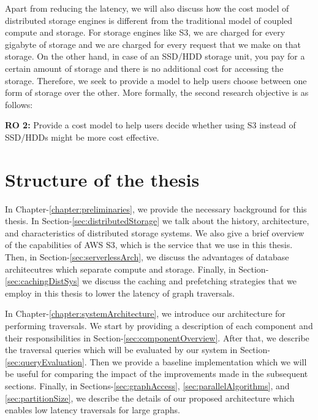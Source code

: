 \medskip
Apart from reducing the latency, we will also discuss how the cost model of
distributed storage engines is different from the traditional model of coupled
compute and storage. For storage engines like S3, we are charged for every
gigabyte of storage and we are charged for every request that we make on that
storage. On the other hand, in case of an SSD/HDD storage unit, you pay for a
certain amount of storage and there is no additional cost for accessing the
storage. Therefore, we seek to provide a model to help users choose between one
form of storage over the other. More formally, the second research objective is
as follows:
\begin{displayquote}
    \textbf{RO 2:} Provide a cost model to help users decide whether using S3
    instead of SSD/HDDs might be more cost effective.
\end{displayquote}


\section{Structure of the thesis}

\medskip
In Chapter-\ref{chapter:preliminaries}, we provide the necessary background for
this thesis. In Section-\ref{sec:distributedStorage} we talk about the
history, architecture, and characteristics of distributed storage systems. We
also give a brief overview of the capabilities of AWS S3, which is the service
that we use in this thesis. Then,
in Section-\ref{sec:serverlessArch}, we discuss the advantages of database
architecutres which separate compute and storage. Finally, in
Section-\ref{sec:cachingDistSys} we discuss the caching and prefetching
strategies that we employ in this thesis to lower the latency of graph
traversals.

\medskip
In Chapter-\ref{chapter:systemArchitecture}, we introduce our architecture for
performing traversals. We start by providing a description of each component and their
responsibilities in Section-\ref{sec:componentOverview}. After that, we describe
the traversal queries which will be evaluated by our system in Section-\ref{sec:queryEvaluation}.
Then we provide a baseline implementation which we will be useful for comparing
the impact of the improvements made in the subsequent sections. Finally, in
Sections-\ref{sec:graphAccess}, \ref{sec:parallelAlgorithms}, and
\ref{sec:partitionSize}, we describe the details of our proposed architecture
which enables low latency traversals for large graphs.

